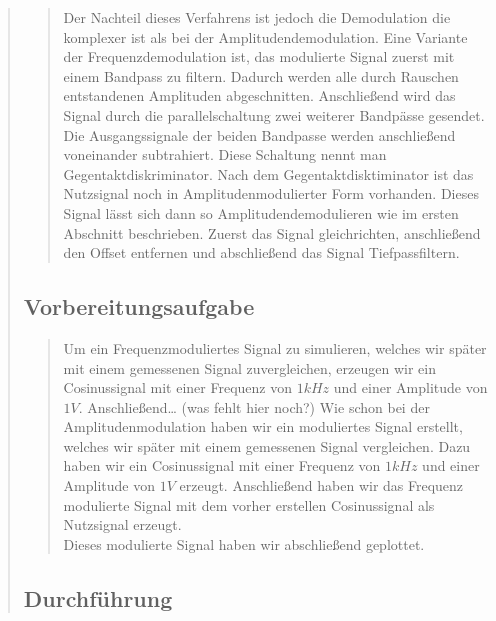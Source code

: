 \begin{quote}
\begin{quote}
        Der Nachteil dieses Verfahrens ist jedoch die Demodulation die komplexer ist als bei der Amplitudendemodulation.
        Eine Variante der Frequenzdemodulation ist, das modulierte Signal zuerst mit einem Bandpass zu filtern. Dadurch
        werden alle durch Rauschen entstandenen Amplituden abgeschnitten. Anschließend wird das Signal durch die
        parallelschaltung zwei weiterer Bandpässe gesendet. Die Ausgangssignale der beiden Bandpasse werden anschließend
        voneinander subtrahiert. Diese Schaltung nennt man Gegentaktdiskriminator. Nach dem Gegentaktdisktiminator ist
        das Nutzsignal noch in Amplitudenmodulierter Form vorhanden. Dieses Signal lässt sich dann so
        Amplitudendemodulieren wie im ersten Abschnitt beschrieben. Zuerst das Signal gleichrichten, anschließend den
        Offset entfernen und abschließend das Signal Tiefpassfiltern.
    
    \end{quote}
    
    \subsection{Vorbereitungsaufgabe}
    \begin{quote}
        Um ein Frequenzmoduliertes Signal zu simulieren, welches wir später mit einem gemessenen Signal zuvergleichen,
        erzeugen wir ein Cosinussignal mit einer Frequenz von $1kHz$ und einer
        Amplitude von $1V$. Anschließend\ldots
        (was fehlt hier noch?)
        Wie schon bei der Amplitudenmodulation  haben wir ein moduliertes Signal erstellt, welches wir später mit einem
        gemessenen Signal vergleichen. Dazu haben wir ein Cosinussignal mit einer Frequenz von
        $1kHz$ und einer Amplitude von $1V$ erzeugt. Anschließend haben wir das Frequenz modulierte Signal mit dem
        vorher erstellen Cosinussignal als Nutzsignal erzeugt.\\
        Dieses modulierte Signal haben wir abschließend geplottet.
    \end{quote}
    
    \subsection{Durchführung}
    \begin{quote}

\end{quote}
\end{quote}
